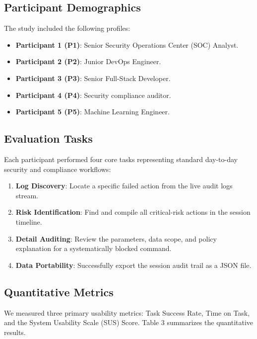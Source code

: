 \documentclass{article}
\begin{document}
\subsection{Participant Demographics}
The study included the following profiles:
\begin{itemize}
    \item \textbf{Participant 1 (P1)}: Senior Security Operations Center (SOC) Analyst.
    \item \textbf{Participant 2 (P2)}: Junior DevOps Engineer.
    \item \textbf{Participant 3 (P3)}: Senior Full-Stack Developer.
    \item \textbf{Participant 4 (P4)}: Security compliance auditor.
    \item \textbf{Participant 5 (P5)}: Machine Learning Engineer.
\end{itemize}

\subsection{Evaluation Tasks}
Each participant performed four core tasks representing standard day-to-day security and compliance workflows:
\begin{enumerate}
    \item \textbf{Log Discovery}: Locate a specific failed action from the live audit logs stream.
    \item \textbf{Risk Identification}: Find and compile all critical-risk actions in the session timeline.
    \item \textbf{Detail Auditing}: Review the parameters, data scope, and policy explanation for a systematically blocked command.
    \item \textbf{Data Portability}: Successfully export the session audit trail as a JSON file.
\end{enumerate}

\subsection{Quantitative Metrics}
We measured three primary usability metrics: Task Success Rate, Time on Task, and the System Usability Scale (SUS) Score. Table 3 summarizes the quantitative results.
\end{document}
